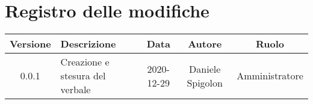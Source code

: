 \section*{Registro delle modifiche}

\begin{center}
	\begin{longtable}{|c|p{5cm}|c|c|c|}
	\hline
	\rowcolor{lighter-grayer}
	\textbf{Versione} & \textbf{Descrizione} & \textbf{Data} & \textbf{Autore} & \textbf{Ruolo} \\
	\hline
	\endfirsthead


	\hline
	0.0.1 & Creazione e stesura del verbale & 2020-12-29 & Daniele Spigolon & Amministratore \\
	\hline
	\end{longtable}
\end{center}